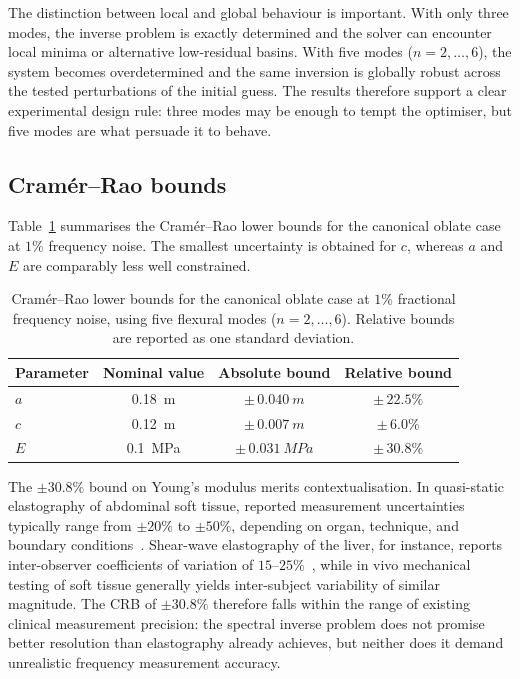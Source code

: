 The distinction between local and global behaviour is important.  With only
three modes, the inverse problem is exactly determined and the solver can
encounter local minima or alternative low-residual basins.  With five modes
($n=2,\ldots,6$), the system becomes overdetermined and the same inversion is
globally robust across the tested perturbations of the initial guess.  The
results therefore support a clear experimental design rule: three modes may be
enough to tempt the optimiser, but five modes are what persuade it to behave.

\subsection{Cram\'er--Rao bounds}

Table~\ref{tab:crlb} summarises the Cram\'er--Rao lower bounds for the canonical
oblate case at $1\%$ frequency noise.  The smallest uncertainty is obtained for
$c$, whereas $a$ and $E$ are comparably less well constrained.

\begin{table}[t]
  \centering
  \caption{Cram\'er--Rao lower bounds for the canonical oblate case at
  $1\%$ fractional frequency noise, using five flexural modes
  ($n=2,\ldots,6$).  Relative bounds are reported as one
  standard deviation.}
  \label{tab:crlb}
  \begin{tabular}{lccc}
    \toprule
    Parameter & Nominal value & Absolute bound & Relative bound \\
    \midrule
    $a$ & \SI{0.18}{m}    & $\pm\,\SI{0.040}{m}$   & $\pm\,22.5\%$ \\
    $c$ & \SI{0.12}{m}    & $\pm\,\SI{0.007}{m}$   & $\pm\,6.0\%$ \\
    $E$ & \SI{0.1}{MPa}   & $\pm\,\SI{0.031}{MPa}$ & $\pm\,30.8\%$ \\
    \bottomrule
  \end{tabular}
\end{table}

The $\pm30.8\%$ bound on Young's modulus merits contextualisation.  In
quasi-static elastography of abdominal soft tissue, reported measurement
uncertainties typically range from $\pm20\%$ to $\pm50\%$, depending on organ,
technique, and boundary conditions~\cite{Doyley2012}.  Shear-wave
elastography of the liver, for instance, reports inter-observer coefficients of
variation of $15$--$25\%$~\cite{Barr2015}, while in vivo mechanical testing of
soft tissue generally yields inter-subject variability of similar
magnitude.  The CRB of $\pm30.8\%$ therefore falls within
the range of existing clinical measurement precision: the spectral inverse
problem does not promise better resolution than elastography already achieves,
but neither does it demand unrealistic frequency measurement accuracy.

